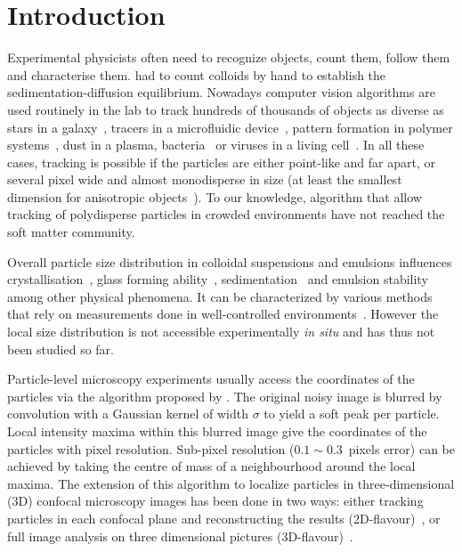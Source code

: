 \documentclass[8.5pt,twoside,twocolumn]{article}
\begin{document}



\section{Introduction}

Experimental physicists often need to recognize objects, count them, follow them and characterise them. \citet{perrin} had to count colloids by hand to establish the sedimentation-diffusion equilibrium. Nowadays computer vision algorithms are used routinely in the lab to track hundreds of thousands of objects as diverse as stars in a galaxy~\cite{Bertin1996}, tracers in a microfluidic device~\cite{Wereley2010}, pattern formation in polymer systems~\cite{tanaka1986application,tanaka1989digital}, dust in a plasma, bacteria~\cite{Zhang2010,Gibiansky2010} or viruses in a living cell~\cite{Brandenburg2007}. In all these cases, tracking is possible if the particles are either point-like and far apart, or several pixel wide and almost monodisperse in size (at least the smallest dimension for anisotropic objects~\cite{Zhang2010,Gibiansky2010}). To our knowledge, algorithm that allow tracking of polydisperse particles in crowded environments have not reached the soft matter community.

Overall particle size distribution in colloidal suspensions and emulsions influences crystallisation~\cite{Pusey1987,Henderson1996,Fasolo2003,Schope2007,pusey2009hard}, glass forming ability~\cite{Pusey1987,Henderson1996,Senkov2001,Schope2007,pusey2009hard}, sedimentation~\cite{Binks1998,Leocmach2010} and emulsion stability~\cite{Biben1993,Binks1998} among other physical phenomena. It can be characterized by various methods that rely on measurements done in well-controlled environments~\cite{Lange1995,Provder1997,Finder2004}. However the local size distribution is not accessible experimentally \emph{in situ} and has thus not been studied so far.

Particle-level microscopy experiments usually access the coordinates of the particles via the algorithm proposed by \citet{Crocker1996}. The original noisy image is blurred by convolution with a Gaussian kernel of width $\sigma$ to yield a soft peak per particle. Local intensity maxima within this blurred image give the coordinates of the particles with pixel resolution. Sub-pixel resolution ($0.1\sim0.3$~pixels error) can be achieved by taking the centre of mass of a neighbourhood around the local maxima. The extension of this algorithm to localize particles in three-dimensional (3D) confocal microscopy images has been done in two ways: either tracking particles in each confocal plane and reconstructing the results (2D-flavour)~\citep{vanblaaderen1995rss, Lu2007}, or full image analysis on three dimensional pictures (3D-flavour)~\citep{dinsmore2001tdc}.
\end{document}
